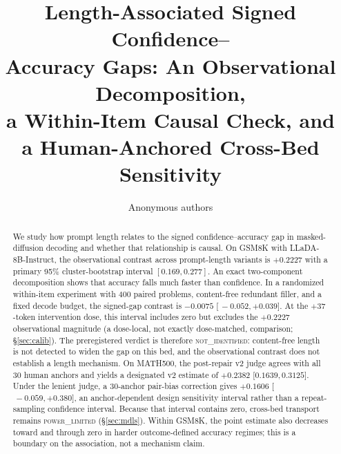 \documentclass{article}
\title{Length-Associated Signed Confidence--\\Accuracy Gaps: An Observational Decomposition,\\a Within-Item Causal Check, and\\a Human-Anchored Cross-Bed Sensitivity}
\author{Anonymous authors}
\date{}
\begin{document}
\maketitle
{}

\begin{abstract}
We study how prompt length relates to the signed confidence--accuracy gap in
masked-diffusion decoding and whether that relationship is causal.  On GSM8K with
LLaDA-8B-Instruct, the observational contrast across prompt-length variants is
$+0.2227$ with a primary 95\% cluster-bootstrap interval $[0.169,0.277]$.
An exact two-component decomposition shows that accuracy falls much faster than
confidence.  In a randomized within-item experiment with $400$ paired problems,
content-free redundant filler, and a fixed decode budget, the signed-gap contrast is
$-0.0075$ [$\,{-}0.052,+0.039$].  At the $+37$-token intervention dose, this interval
includes zero but excludes the $+0.2227$ observational magnitude (a dose-local, not
exactly dose-matched, comparison; \S\ref{sec:calib}).  The preregistered verdict is
therefore \textsc{not\_identified}: content-free length is not detected to widen the
gap on this bed, and the observational contrast does not establish a length mechanism.
On MATH500, the post-repair v2 judge agrees with all $30$ human anchors and yields a
designated v2 estimate of $+0.2382$ [$0.1639,0.3125$].  Under the lenient judge, a
$30$-anchor pair-bias correction gives $+0.1606$ [$\,{-}0.059,+0.380$], an
anchor-dependent design sensitivity interval rather than a repeat-sampling confidence
interval.  Because that interval contains zero, cross-bed transport remains
\textsc{power\_limited} (\S\ref{sec:mdls}).  Within GSM8K, the point estimate also
decreases toward and through zero in harder outcome-defined accuracy regimes; this is a
boundary on the association, not a mechanism claim.
\end{abstract}
\end{document}
